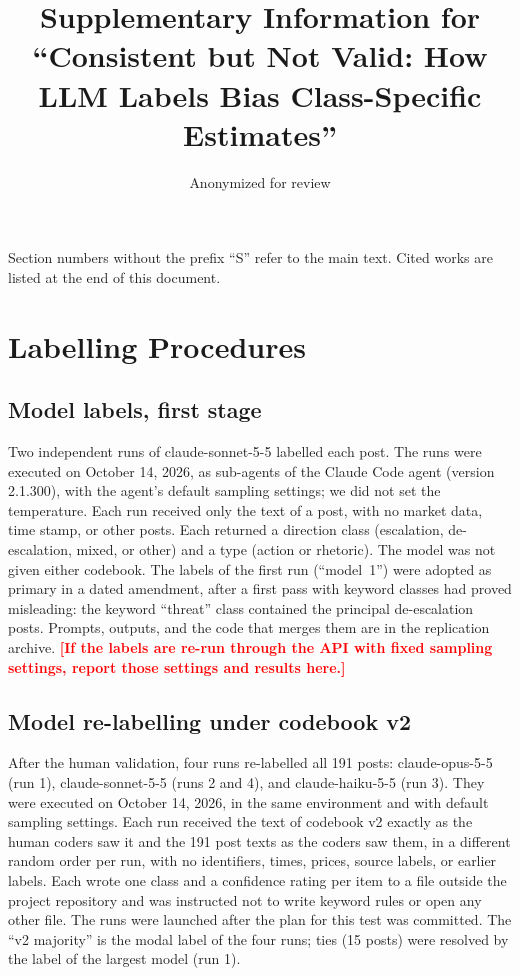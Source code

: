 \documentclass[11pt]{article}
\title{Supplementary Information for\\ ``Consistent but Not Valid: How LLM Labels Bias Class-Specific Estimates''}
\author{Anonymized for review}
\date{}
\newcommand{\chk}[1]{\textcolor{red}{\textbf{[#1]}}}
\begin{document}
\maketitle

\noindent Section numbers without the prefix ``S'' refer to the main text. Cited works are listed at the end of this document.

\tableofcontents
\clearpage

\section{Labelling Procedures}

\subsection{Model labels, first stage}

Two independent runs of claude-sonnet-5-5 labelled each post. The runs were executed on October 14, 2026, as sub-agents of the Claude Code agent (version 2.1.300), with the agent's default sampling settings; we did not set the temperature. Each run received only the text of a post, with no market data, time stamp, or other posts. Each returned a direction class (escalation, de-escalation, mixed, or other) and a type (action or rhetoric). The model was not given either codebook. The labels of the first run (``model~1'') were adopted as primary in a dated amendment, after a first pass with keyword classes had proved misleading: the keyword ``threat'' class contained the principal de-escalation posts. Prompts, outputs, and the code that merges them are in the replication archive. \chk{If the labels are re-run through the API with fixed sampling settings, report those settings and results here.}

\subsection{Model re-labelling under codebook v2}

After the human validation, four runs re-labelled all 191 posts: claude-opus-5-5 (run 1), claude-sonnet-5-5 (runs 2 and 4), and claude-haiku-5-5 (run 3). They were executed on October 14, 2026, in the same environment and with default sampling settings. Each run received the text of codebook v2 exactly as the human coders saw it and the 191 post texts as the coders saw them, in a different random order per run, with no identifiers, times, prices, source labels, or earlier labels. Each wrote one class and a confidence rating per item to a file outside the project repository and was instructed not to write keyword rules or open any other file. The runs were launched after the plan for this test was committed. The ``v2 majority'' is the modal label of the four runs; ties (15 posts) were resolved by the label of the largest model (run 1).
\end{document}
